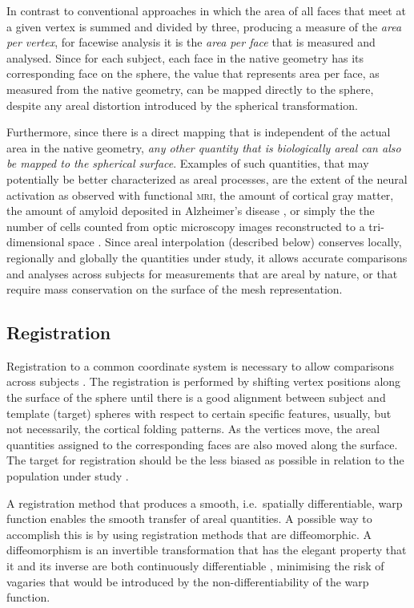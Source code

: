 In contrast to conventional approaches in which the area of all faces that meet at a given vertex is summed and divided by three, producing a measure of the \emph{area per vertex}, for facewise analysis it is the \emph{area per face} that is measured and analysed. Since for each subject, each face in the native geometry has its corresponding face on the sphere, the value that represents area per face, as measured from the native geometry, can be mapped directly to the sphere, despite any areal distortion introduced by the spherical transformation.

Furthermore, since there is a direct mapping that is independent of the actual area in the native geometry, \emph{any other quantity that is biologically areal can also be mapped to the spherical surface}. Examples of such quantities, that may potentially be better characterized as areal processes, are the extent of the neural activation as observed with functional \textsc{mri}, the amount of cortical gray matter, the amount of amyloid deposited in Alzheimer's disease \citep{Klunk2004, Clark2011}, or simply the the number of cells counted from optic microscopy images reconstructed to a tri-dimensional space \citep{Schormann1998}. Since areal interpolation (described below) conserves locally, regionally and globally the quantities under study, it allows accurate comparisons and analyses across subjects for measurements that are areal by nature, or that require mass conservation on the surface of the mesh representation.

\subsection{Registration}

Registration to a common coordinate system is necessary to allow comparisons across subjects \citep{Drury1996}. The registration is performed by shifting vertex positions along the surface of the sphere until there is a good alignment between subject and template (target) spheres with respect to certain specific features, usually, but not necessarily, the cortical folding patterns. As the vertices move, the areal quantities assigned to the corresponding faces are also moved along the surface. The target for registration should be the less biased as possible in relation to the population under study \citep{Thompson2002}.

A registration method that produces a smooth, i.e.\ spatially differentiable, warp function enables the smooth transfer of areal quantities. A possible way to accomplish this is by using registration methods that are diffeomorphic. A diffeomorphism is an invertible transformation that has the elegant property that it and its inverse are both continuously differentiable \citep{Christensen1996, Miller1997}, minimising the risk of vagaries that would be introduced by the non-differentiability of the warp function.

